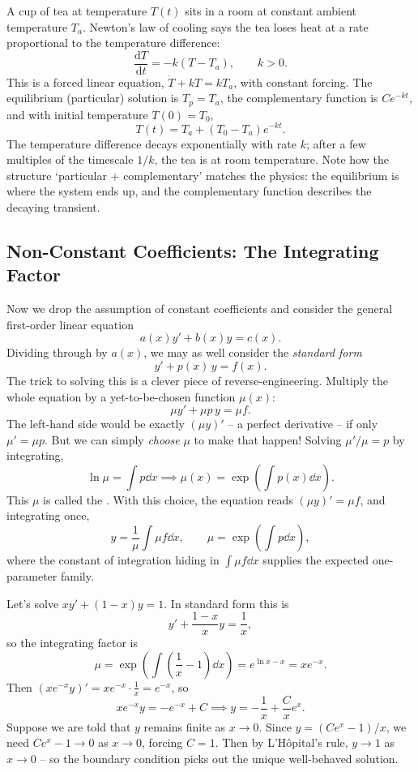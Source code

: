 \documentclass[a4paper]{scrartcl}
\begin{document}
\begin{example}
	A cup of tea at temperature $T(t)$ sits in a room at constant ambient temperature $T_a$. Newton's law of cooling says the tea loses heat at a rate proportional to the temperature difference:
	$$
	\frac{\mathrm{d}T}{\mathrm{d}t} = -k(T - T_a), \qquad k > 0.
	$$
	This is a forced linear equation, $\dot T + kT = kT_a$, with constant forcing. The equilibrium (particular) solution is $T_p = T_a$, the complementary function is $Ce^{-kt}$, and with initial temperature $T(0) = T_0$,
	$$
	T(t) = T_a + (T_0 - T_a)e^{-kt}.
	$$
	The temperature difference decays exponentially with rate $k$; after a few multiples of the timescale $1/k$, the tea is at room temperature. Note how the structure `particular + complementary' matches the physics: the equilibrium is where the system ends up, and the complementary function describes the decaying transient.
\end{example}

\subsection{Non-Constant Coefficients: The Integrating Factor}

Now we drop the assumption of constant coefficients and consider the general first-order linear equation
$$
a(x) y' + b(x) y = c(x).
$$
Dividing through by $a(x)$, we may as well consider the \emph{standard form}
$$
y' + p(x)\, y = f(x).
$$
The trick to solving this is a clever piece of reverse-engineering. Multiply the whole equation by a yet-to-be-chosen function $\mu(x)$:
$$
\mu y' + \mu p \, y = \mu f.
$$
The left-hand side would be exactly $(\mu y)'$ -- a perfect derivative -- if only $\mu' = \mu p$. But we can simply \emph{choose} $\mu$ to make that happen! Solving $\mu'/\mu = p$ by integrating,
$$
\ln \mu = \int p \dd x \implies \mu(x) = \exp\left(\int p(x) \dd x\right).
$$
This $\mu$ is called the . With this choice, the equation reads $(\mu y)' = \mu f$, and integrating once,
$$
y = \frac{1}{\mu}\int \mu f \dd x, \qquad \mu = \exp\left(\int p \dd x\right),
$$
where the constant of integration hiding in $\int \mu f \dd x$ supplies the expected one-parameter family.

\begin{example}
	Let's solve $x y' + (1 - x) y = 1$. In standard form this is
	$$
	y' + \frac{1 - x}{x} y = \frac{1}{x},
	$$
	so the integrating factor is
	$$
	\mu = \exp\left(\int \left(\frac{1}{x} - 1\right) \dd x\right) = e^{\ln x - x} = x e^{-x}.
	$$
	Then $(x e^{-x} y)' = x e^{-x} \cdot \frac 1x = e^{-x}$, so
	$$
	x e^{-x} y = -e^{-x} + C \implies y = -\frac{1}{x} + \frac{C}{x} e^{x}.
	$$
	Suppose we are told that $y$ remains finite as $x \to 0$. Since $y = (Ce^x - 1)/x$, we need $Ce^x - 1 \to 0$ as $x \to 0$, forcing $C = 1$. Then by L'H\^opital's rule, $y \to 1$ as $x \to 0$ -- so the boundary condition picks out the unique well-behaved solution.
\end{example}
\end{document}
